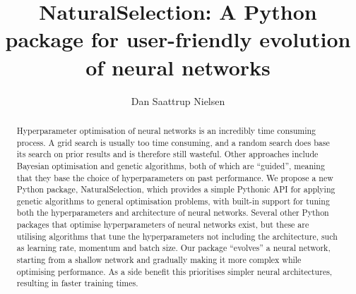 \documentclass[sigconf]{acmart}
\begin{document}
\title{NaturalSelection: A Python package for user-friendly evolution of neural networks}

\author{Dan Saattrup Nielsen}


\begin{abstract}
  Hyperparameter optimisation of neural networks is an incredibly time consuming process. A grid search is usually too time consuming, and a random search does base its search on prior results and is therefore still wasteful. Other approaches include Bayesian optimisation and genetic algorithms, both of which are ``guided'', meaning that they base the choice of hyperparameters on past performance. We propose a new Python package, NaturalSelection, which provides a simple Pythonic API for applying genetic algorithms to general optimisation problems, with built-in support for tuning both the hyperparameters and architecture of neural networks. Several other Python packages that optimise hyperparameters of neural networks exist, but these are utilising algorithms that tune the hyperparameters not including the architecture, such as learning rate, momentum and batch size. Our package ``evolves'' a neural network, starting from a shallow network and gradually making it more complex while optimising performance. As a side benefit this prioritises simpler neural architectures, resulting in faster training times.
\end{abstract}


\end{document}
